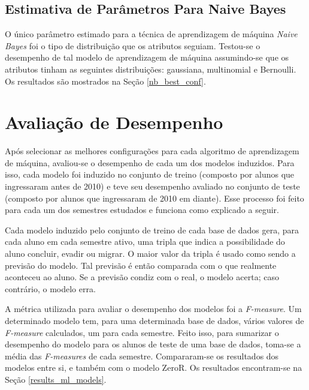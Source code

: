 \subsection{Estimativa de Parâmetros Para Naive Bayes}
O único parâmetro estimado para a técnica de aprendizagem de máquina \textit{Naive Bayes} foi
o tipo de distribuição que os atributos seguiam. Testou-se o desempenho de tal modelo
de aprendizagem de máquina assumindo-se que os atributos tinham as seguintes
distribuições: gaussiana, multinomial e Bernoulli. Os resultados são mostrados na
Seção \ref{nb_best_conf}. 

\section{Avaliação de Desempenho}
Após selecionar as melhores configurações para cada algoritmo de aprendizagem de
máquina, avaliou-se o desempenho de cada um dos modelos induzidos. Para isso, cada
modelo foi induzido no conjunto de treino (composto por alunos
que ingressaram antes de 2010) e teve seu desempenho avaliado no conjunto de teste
(composto por alunos que ingressaram de 2010 em diante). Esse processo foi feito para
cada um dos semestres estudados e funciona como explicado a seguir. 
\par Cada modelo induzido pelo conjunto de treino de cada base de dados gera, para
cada aluno em cada semestre ativo, uma tripla que indica a possibilidade do aluno
concluir, evadir ou migrar. O
maior valor da tripla é usado como sendo a previsão do modelo. Tal previsão é
então comparada com o que realmente aconteceu ao aluno. Se a previsão condiz com o
real, o modelo acerta; caso contrário, o modelo erra. 
\par A métrica utilizada para avaliar o desempenho dos
modelos foi a \textit{F-measure}. Um determinado modelo tem, para uma determinada
base de dados, vários valores de \textit{F-measure} calculados, um para cada semestre. Feito
isso, para sumarizar o desempenho do modelo para os alunos de teste de uma base de
dados, toma-se a média das \textit{F-measures} de cada semestre. Compararam-se os
resultados dos modelos entre si, e também com o modelo ZeroR. Os resultados
encontram-se na Seção \ref{results_ml_models}.

